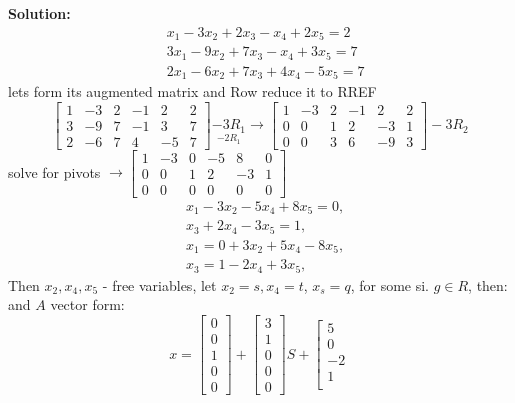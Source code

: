 \documentclass{article}
\begin{document}
\begin{enumerate}
\textbf{Solution:}
$$
\begin{aligned}
& x_1-3 x_2+2 x_3-x_4+2 x_5=2 \\
& 3 x_1-9 x_2+7 x_3-x_4+3 x_5=7 \\
& 2 x_1-6 x_2+7 x_3+4 x_4-5 x_5=7
\end{aligned}
$$
lets form its augmented matrix and Row reduce it to RREF
$$
\left[\begin{array}{ccccc|c}
1 & -3 & 2 & -1 & 2 & 2 \\
3 & -9 & 7 & -1 & 3 & 7 \\
2 & -6 & 7 & 4 & -5 & 7
\end{array}\right] \underset{-2 R_1}{-3 R_1} \rightarrow\left[\begin{array}{ccccc|c}
1 & -3 & 2 & -1 & 2 & 2 \\
0 & 0 & 1 & 2 & -3 & 1 \\
0 & 0 & 3 & 6 & -9 & 3
\end{array}\right]-3 R_2
$$
solve for pivots
$\rightarrow\left[\begin{array}{ccccc|c}1 & -3 & 0 & -5 & 8 & 0 \\ 0 & 0 & 1 & 2 & -3 & 1 \\ 0 & 0 & 0 & 0 & 0 & 0\end{array}\right]$
$$
\begin{aligned}
& x_1-3 x_2-5 x_4+8 x_5=0, \\
& x_3+2 x_4-3 x_5=1, \\
& x_1=0+3 x_2+5 x_4-8 x_5, \\
& x_3=1-2 x_4+3 x_5,
\end{aligned}
$$
Then $x_2, x_4, x_5$ - free variables, let $x_2=s, x_4=t$,
$x_s=q$, for some si. $g \in R$, then:
and $A$ vector form:
$$
x=\left[\begin{array}{l}
0 \\
0 \\
1 \\
0 \\
0
\end{array}\right]+\left[\begin{array}{l}
3 \\
1 \\
0 \\
0 \\
0
\end{array}\right] S+\left[\begin{array}{c}
5 \\
0 \\
-2 \\
1 \\

\end{array}$$
\end{enumerate}
\end{document}
